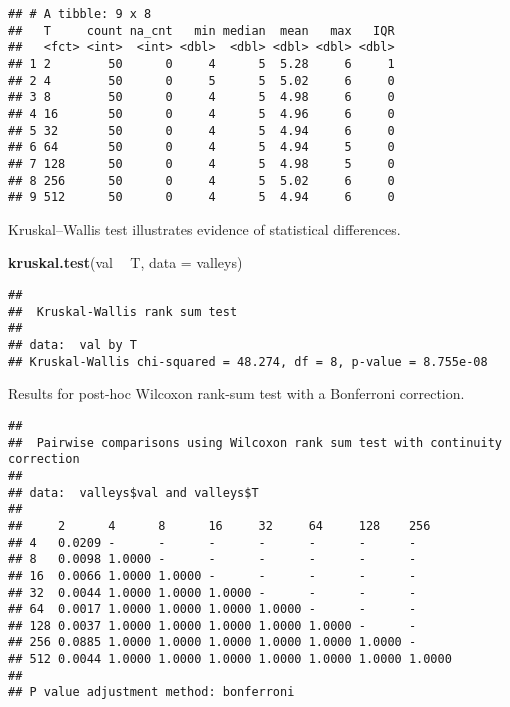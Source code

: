 \documentclass[]{book}
\newenvironment{Shaded}{\begin{snugshade}}{\end{snugshade}}
\newcommand{\DataTypeTok}[1]{\textcolor[rgb]{0.13,0.29,0.53}{#1}}
\newcommand{\KeywordTok}[1]{\textcolor[rgb]{0.13,0.29,0.53}{\textbf{#1}}}
\newcommand{\NormalTok}[1]{#1}
\newcommand{\OperatorTok}[1]{\textcolor[rgb]{0.81,0.36,0.00}{\textbf{#1}}}
\newcommand{\OtherTok}[1]{\textcolor[rgb]{0.56,0.35,0.01}{#1}}
\newcommand{\StringTok}[1]{\textcolor[rgb]{0.31,0.60,0.02}{#1}}
\begin{document}
\begin{verbatim}
## # A tibble: 9 x 8
##   T     count na_cnt   min median  mean   max   IQR
##   <fct> <int>  <int> <dbl>  <dbl> <dbl> <dbl> <dbl>
## 1 2        50      0     4      5  5.28     6     1
## 2 4        50      0     5      5  5.02     6     0
## 3 8        50      0     4      5  4.98     6     0
## 4 16       50      0     4      5  4.96     6     0
## 5 32       50      0     4      5  4.94     6     0
## 6 64       50      0     4      5  4.94     5     0
## 7 128      50      0     4      5  4.98     5     0
## 8 256      50      0     4      5  5.02     6     0
## 9 512      50      0     4      5  4.94     6     0
\end{verbatim}

Kruskal--Wallis test illustrates evidence of statistical differences.

\begin{Shaded}
\begin{Highlighting}[]
\KeywordTok{kruskal.test}\NormalTok{(val }\OperatorTok{~}\StringTok{ }\NormalTok{T, }\DataTypeTok{data =}\NormalTok{ valleys)}
\end{Highlighting}
\end{Shaded}

\begin{verbatim}
## 
##  Kruskal-Wallis rank sum test
## 
## data:  val by T
## Kruskal-Wallis chi-squared = 48.274, df = 8, p-value = 8.755e-08
\end{verbatim}

Results for post-hoc Wilcoxon rank-sum test with a Bonferroni correction.

\begin{Shaded}
\end{Shaded}

\begin{verbatim}
## 
##  Pairwise comparisons using Wilcoxon rank sum test with continuity correction 
## 
## data:  valleys$val and valleys$T 
## 
##     2      4      8      16     32     64     128    256   
## 4   0.0209 -      -      -      -      -      -      -     
## 8   0.0098 1.0000 -      -      -      -      -      -     
## 16  0.0066 1.0000 1.0000 -      -      -      -      -     
## 32  0.0044 1.0000 1.0000 1.0000 -      -      -      -     
## 64  0.0017 1.0000 1.0000 1.0000 1.0000 -      -      -     
## 128 0.0037 1.0000 1.0000 1.0000 1.0000 1.0000 -      -     
## 256 0.0885 1.0000 1.0000 1.0000 1.0000 1.0000 1.0000 -     
## 512 0.0044 1.0000 1.0000 1.0000 1.0000 1.0000 1.0000 1.0000
## 
## P value adjustment method: bonferroni
\end{verbatim}
\end{document}
